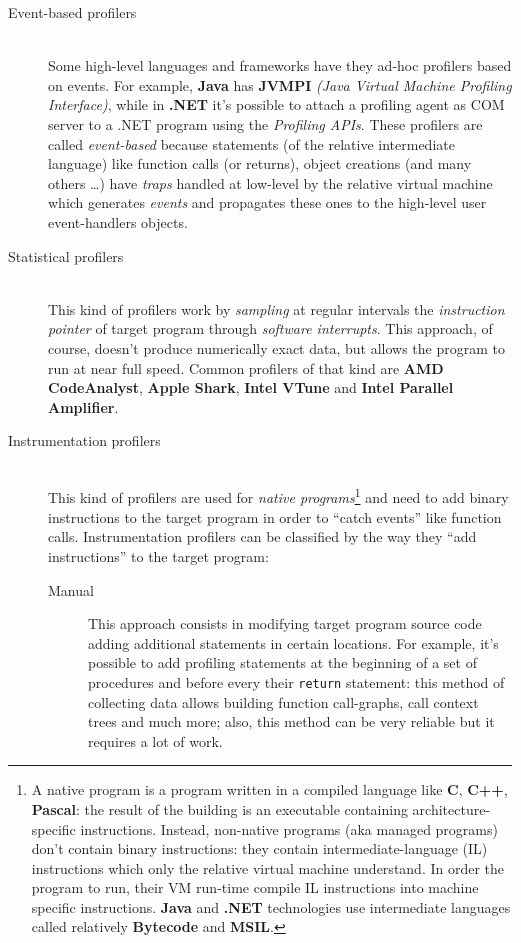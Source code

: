\documentclass[a4paper,11pt]{report}
\begin{document}
\begin{description}
\item[Event-based profilers] \hfill \\
Some high-level languages and frameworks have they ad-hoc profilers based on events. For example, \textbf{Java} has \textbf{JVMPI} \textit{(Java Virtual Machine Profiling Interface)}, while in \textbf{.NET} it's possible to attach a profiling agent as COM server to a .NET program using the \emph{Profiling APIs}. These profilers are called \emph{event-based} because statements (of the relative intermediate language) like function calls (or returns), object creations (and many others \ldots) have \emph{traps} handled at low-level by the relative virtual machine which generates \emph{events} and propagates these ones to the high-level user event-handlers objects.
\item[Statistical profilers] \hfill \\
This kind of profilers work by \emph{sampling} at regular intervals the \emph{instruction pointer} of target program through \emph{software interrupts}. This approach, of course, doesn't produce numerically exact data, but allows the program to run at near full speed. Common profilers of that kind are \textbf{AMD CodeAnalyst}, \textbf{Apple Shark}, \textbf{Intel VTune} and \textbf{Intel Parallel Amplifier}.

\item[Instrumentation profilers] \hfill \\
This kind of profilers are used for \emph{native programs}\footnote{A native program is a program written in a compiled language like \textbf{C}, \textbf{C++}, \textbf{Pascal}: the result of the building is an executable containing architecture-specific instructions. Instead, non-native programs (aka managed programs) don't contain binary instructions: they contain intermediate-language (IL) instructions which only the relative virtual machine understand. In order the program to run, their VM run-time compile IL instructions into machine specific instructions. \textbf{Java} and \textbf{.NET} technologies use intermediate languages called relatively \textbf{Bytecode} and \textbf{MSIL}.} and need to add binary instructions to the target program in order to ``catch events'' like function calls. Instrumentation profilers can be classified by the way they ``add instructions'' to the target program:

\begin{description}
\item[Manual]
This approach consists in modifying target program source code adding additional statements in certain locations. For example, it's possible to add profiling statements at the beginning of a set of procedures and before every their \verb|return| statement: this method of collecting data allows building function call-graphs, call context trees and much more; also, this method can be very reliable but it requires a lot of work.


\end{description}
\end{description}
\end{document}
